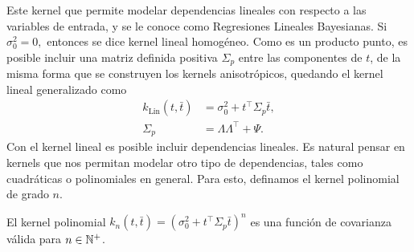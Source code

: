 Este kernel que permite modelar dependencias lineales con respecto a las variables de entrada, y se le conoce como Regresiones Lineales Bayesianas. Si \(\sigma_{0}^{2} = 0,\) entonces se dice kernel lineal homogéneo. Como es un producto punto, es posible incluir una matriz definida positiva \(\Sigma_{p}\) entre las componentes de \(t\), de la misma forma que se construyen los kernels anisotrópicos, quedando el kernel lineal generalizado como
\begin{align*}
	k_{\mathrm{Lin}} (t, \bar{t})	&= \sigma_{0}^{2} + t^{\top} \Sigma_{p} \bar{t},\\
	\Sigma_{p}						&= \Lambda \Lambda^{\top} + \Psi.
\end{align*}
Con el kernel lineal es posible incluir dependencias lineales. Es natural pensar en kernels que nos permitan modelar otro tipo de dependencias, tales como cuadráticas o polinomiales en general. Para esto, definamos el kernel polinomial de grado \(n\).

\begin{definition}
	El kernel polinomial \(k_{n} (t, \bar{t}) = \left(\sigma_{0}^{2} + t^{\top} \Sigma_{p} \bar{t}\right)^{n}\) es una función de covarianza válida para \(n \in \mathbb{N}^+\).
\end{definition}

